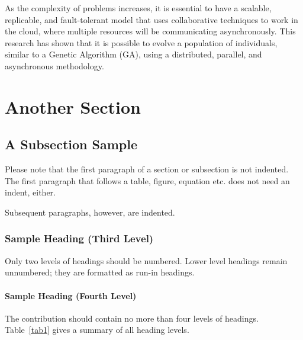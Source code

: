 \documentclass[runningheads]{llncs}
\begin{document}
As the complexity of problems increases, it is essential to have a scalable,
replicable, and fault-tolerant model that uses collaborative techniques to work
in the cloud, where multiple resources will be communicating asynchronously.
This research has shown that it is possible to evolve a population of
individuals, similar to a Genetic Algorithm (GA), using a distributed,
parallel, and asynchronous methodology.


%
%
%



% 



\section{Another Section}
\subsection{A Subsection Sample}
Please note that the first paragraph of a section or subsection is
not indented. The first paragraph that follows a table, figure,
equation etc. does not need an indent, either.

Subsequent paragraphs, however, are indented.

\subsubsection{Sample Heading (Third Level)} Only two levels of
headings should be numbered. Lower level headings remain unnumbered;
they are formatted as run-in headings.

\paragraph{Sample Heading (Fourth Level)}
The contribution should contain no more than four levels of
headings. Table~\ref{tab1} gives a summary of all heading levels.
\end{document}
